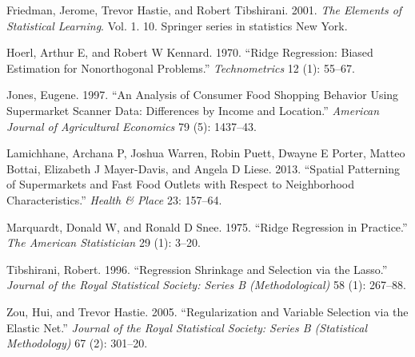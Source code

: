 \documentclass[
]{article}
\begin{document}
\leavevmode\hypertarget{ref-friedman2001elements}{}%
Friedman, Jerome, Trevor Hastie, and Robert Tibshirani. 2001. \emph{The
Elements of Statistical Learning}. Vol. 1. 10. Springer series in
statistics New York.

\leavevmode\hypertarget{ref-hoerl1970ridge}{}%
Hoerl, Arthur E, and Robert W Kennard. 1970. ``Ridge Regression: Biased
Estimation for Nonorthogonal Problems.'' \emph{Technometrics} 12 (1):
55--67.

\leavevmode\hypertarget{ref-jones1997analysis}{}%
Jones, Eugene. 1997. ``An Analysis of Consumer Food Shopping Behavior
Using Supermarket Scanner Data: Differences by Income and Location.''
\emph{American Journal of Agricultural Economics} 79 (5): 1437--43.

\leavevmode\hypertarget{ref-lamichhane2013spatial}{}%
Lamichhane, Archana P, Joshua Warren, Robin Puett, Dwayne E Porter,
Matteo Bottai, Elizabeth J Mayer-Davis, and Angela D Liese. 2013.
``Spatial Patterning of Supermarkets and Fast Food Outlets with Respect
to Neighborhood Characteristics.'' \emph{Health \& Place} 23: 157--64.

\leavevmode\hypertarget{ref-marquardt1975ridge}{}%
Marquardt, Donald W, and Ronald D Snee. 1975. ``Ridge Regression in
Practice.'' \emph{The American Statistician} 29 (1): 3--20.

\leavevmode\hypertarget{ref-tibshirani1996regression}{}%
Tibshirani, Robert. 1996. ``Regression Shrinkage and Selection via the
Lasso.'' \emph{Journal of the Royal Statistical Society: Series B
(Methodological)} 58 (1): 267--88.

\leavevmode\hypertarget{ref-zou2005regularization}{}%
Zou, Hui, and Trevor Hastie. 2005. ``Regularization and Variable
Selection via the Elastic Net.'' \emph{Journal of the Royal Statistical
Society: Series B (Statistical Methodology)} 67 (2): 301--20.
\end{document}
